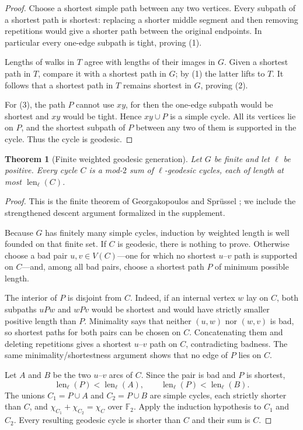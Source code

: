 \documentclass[11pt]{amsart}
\newtheorem{theorem}{Theorem}[section]
\theoremstyle{definition}
\newcommand{\Ftwo}{\mathbb{F}_2}
\newcommand{\len}{\operatorname{len}}
\begin{document}
\begin{proof}
Choose a shortest simple path between any two vertices.  Every subpath of a shortest path is shortest: replacing a shorter middle segment and then removing repetitions would give a shorter path between the original endpoints.  In particular every one-edge subpath is tight, proving (1).

Lengths of walks in $T$ agree with lengths of their images in $G$.  Given a shortest path in $T$, compare it with a shortest path in $G$; by (1) the latter lifts to $T$.  It follows that a shortest path in $T$ remains shortest in $G$, proving (2).

For (3), the path $P$ cannot use $xy$, for then the one-edge subpath would be shortest and $xy$ would be tight.  Hence $xy\cup P$ is a simple cycle.  All its vertices lie on $P$, and the shortest subpath of $P$ between any two of them is supported in the cycle.  Thus the cycle is geodesic.
\end{proof}

\begin{theorem}[Finite weighted geodesic generation]\label{thm:generation}
Let $G$ be finite and let $\ell$ be positive.  Every cycle $C$ is a mod-$2$ sum of $\ell$-geodesic cycles, each of length at most $\len_\ell(C)$.
\end{theorem}

\begin{proof}
This is the finite theorem of Georgakopoulos and Spr\"ussel \cite[Theorem~3.1]{GeorgakopoulosSpruessel2009}; we include the strengthened descent argument formalized in the supplement.

Because $G$ has finitely many simple cycles, induction by weighted length is well founded on that finite set.  If $C$ is geodesic, there is nothing to prove.  Otherwise choose a bad pair $u,v\in V(C)$---one for which no shortest $u$--$v$ path is supported on $C$---and, among all bad pairs, choose a shortest path $P$ of minimum possible length.

The interior of $P$ is disjoint from $C$.  Indeed, if an internal vertex $w$ lay on $C$, both subpaths $uPw$ and $wPv$ would be shortest and would have strictly smaller positive length than $P$.  Minimality says that neither $(u,w)$ nor $(w,v)$ is bad, so shortest paths for both pairs can be chosen on $C$.  Concatenating them and deleting repetitions gives a shortest $u$--$v$ path on $C$, contradicting badness.  The same minimality/shortestness argument shows that no edge of $P$ lies on $C$.

Let $A$ and $B$ be the two $u$--$v$ arcs of $C$.  Since the pair is bad and $P$ is shortest,
\[
  \len_\ell(P)<\len_\ell(A),\qquad
  \len_\ell(P)<\len_\ell(B).
\]
The unions $C_1=P\cup A$ and $C_2=P\cup B$ are simple cycles, each strictly shorter than $C$, and
$\chi_{C_1}+\chi_{C_2}=\chi_C$ over $\Ftwo$.  Apply the induction hypothesis to $C_1$ and $C_2$.  Every resulting geodesic cycle is shorter than $C$ and their sum is $C$.
\end{proof}
\end{document}
